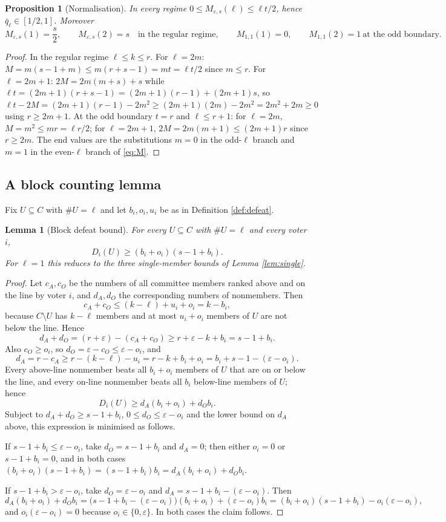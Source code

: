 \documentclass[11pt]{article}
\theoremstyle{plain}
\newtheorem{lemma}{Lemma}
\newtheorem{proposition}{Proposition}
\theoremstyle{definition}
\newcommand{\eps}{\varepsilon}
\begin{document}
\begin{proposition}[Normalisation]
\label{prop:normalisation}
In every regime $0\le M_{\eps,s}(\ell)\le \ell t/2$, hence $\bar q_\ell\in[1/2,1]$. Moreover
\[
M_{\eps,s}(1)=\frac{s}{2},\qquad M_{\eps,s}(2)=s\quad\text{in the regular regime},
\qquad M_{1,1}(1)=0,\qquad M_{1,1}(2)=1\ \text{at the odd boundary}.
\]
\end{proposition}

\begin{proof}
In the regular regime $\ell\le k\le r$. For $\ell=2m$: $M=m(s-1+m)\le m(r+s-1)=mt=\ell t/2$ since $m\le r$. For $\ell=2m+1$: $2M=2m(m+s)+s$ while $\ell t=(2m+1)(r+s-1)=(2m+1)(r-1)+(2m+1)s$, so $\ell t-2M=(2m+1)(r-1)-2m^2\ge(2m+1)(2m)-2m^2=2m^2+2m\ge0$ using $r\ge2m+1$. At the odd boundary $t=r$ and $\ell\le r+1$: for $\ell=2m$, $M=m^2\le mr=\ell r/2$; for $\ell=2m+1$, $2M=2m(m+1)\le(2m+1)r$ since $r\ge2m$. The end values are the substitutions $m=0$ in the odd-$\ell$ branch and $m=1$ in the even-$\ell$ branch of \eqref{eq:M}.
\end{proof}

\subsection{A block counting lemma}

Fix $U\subseteq C$ with $\#U=\ell$ and let $b_i,o_i,u_i$ be as in Definition \ref{def:defeat}.

\begin{lemma}[Block defeat bound]
\label{lem:block}
For every $U\subseteq C$ with $\#U=\ell$ and every voter $i$,
\[
D_i(U)\ge (b_i+o_i)(s-1+b_i).
\]
For $\ell=1$ this reduces to the three single-member bounds of Lemma \ref{lem:single}.
\end{lemma}

\begin{proof}
Let $c_A,c_O$ be the numbers of all committee members ranked above and on the line by voter $i$, and $d_A,d_O$ the corresponding numbers of nonmembers. Then
\[
c_A+c_O\le (k-\ell)+u_i+o_i=k-b_i,
\]
because $C\setminus U$ has $k-\ell$ members and at most $u_i+o_i$ members of $U$ are not below the line. Hence
\[
d_A+d_O=(r+\eps)-(c_A+c_O)\ge r+\eps-k+b_i=s-1+b_i .
\]
Also $c_O\ge o_i$, so $d_O=\eps-c_O\le\eps-o_i$, and
\[
d_A=r-c_A\ge r-(k-\ell)-u_i=r-k+b_i+o_i=b_i+s-1-(\eps-o_i).
\]
Every above-line nonmember beats all $b_i+o_i$ members of $U$ that are on or below the line, and every on-line nonmember beats all $b_i$ below-line members of $U$; hence
\[
D_i(U)\ge d_A(b_i+o_i)+d_O b_i .
\]
Subject to $d_A+d_O\ge s-1+b_i$, $0\le d_O\le\eps-o_i$ and the lower bound on $d_A$ above, this expression is minimised as follows.

If $s-1+b_i\le \eps-o_i$, take $d_O=s-1+b_i$ and $d_A=0$; then either $o_i=0$ or $s-1+b_i=0$, and in both cases $(b_i+o_i)(s-1+b_i)=(s-1+b_i)b_i=d_A(b_i+o_i)+d_Ob_i$.

If $s-1+b_i>\eps-o_i$, take $d_O=\eps-o_i$ and $d_A=s-1+b_i-(\eps-o_i)$. Then
\[
d_A(b_i+o_i)+d_O b_i=\bigl(s-1+b_i-(\eps-o_i)\bigr)(b_i+o_i)+(\eps-o_i)b_i=(b_i+o_i)(s-1+b_i)-o_i(\eps-o_i),
\]
and $o_i(\eps-o_i)=0$ because $o_i\in\{0,\eps\}$. In both cases the claim follows.
\end{proof}
\end{document}
